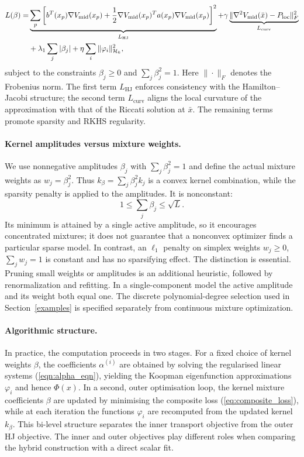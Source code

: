\documentclass[11pt]{article}
\theoremstyle{plain}      %
\theoremstyle{definition} %
\begin{document}
\begin{align}\label{eq:composite_loss}
L(\beta) = & \underbrace{\sum_p \left[ b^{T}(x_p)\nabla V_{\text{mid}}(x_p) + \frac{1}{2} \nabla V_{\text{mid}}(x_p)^{T}a(x_p)\nabla V_{\text{mid}}(x_p)\right]^2}_{L_{\text{HJ}}}
+ \gamma \underbrace{\|\nabla^2 V_{\text{mid}}(\bar{x}) - P_{\text{loc}}\|_F^2}_{L_{\text{curv}}} \notag \\
& + \lambda_1 \sum_j |\beta_j| + \eta \sum_i \|\varphi_i\|_{\mathcal{H}_k}^2,
\end{align}
subject to the constraints \( \beta_j \ge 0 \) and \( \sum_j \beta_j^2 = 1 \). Here $\| \cdot \|_F$ denotes the Frobenius norm. The first term $L_{\text{HJ}}$ enforces consistency with the Hamilton--Jacobi structure; the second term $L_{\text{curv}}$ aligns the local curvature of the approximation with that of the Riccati solution at $\bar{x}$. The remaining terms promote sparsity and RKHS regularity.

\paragraph{Kernel amplitudes versus mixture weights.}\label{sec:amplitudes}
We use nonnegative amplitudes $\beta_j$ with $\sum_j\beta_j^2=1$ and define the actual mixture weights as $w_j=\beta_j^2$. Thus $k_\beta=\sum_j\beta_j^2k_j$ is a convex kernel combination, while the sparsity penalty is applied to the amplitudes. It is nonconstant:
\[
 1\leq\sum_j\beta_j\leq\sqrt L.
\]
Its minimum is attained by a single active amplitude, so it encourages concentrated mixtures; it does not guarantee that a nonconvex optimizer finds a particular sparse model. In contrast, an $\ell_1$ penalty on simplex weights $w_j\geq0$, $\sum_jw_j=1$ is constant and has no sparsifying effect. The distinction is essential. Pruning small weights or amplitudes is an additional heuristic, followed by renormalization and refitting. In a single-component model the active amplitude and its weight both equal one. The discrete polynomial-degree selection used in Section~\ref{examples} is specified separately from continuous mixture optimization.

\paragraph{Algorithmic structure.}
In practice, the computation proceeds in two stages. For a fixed choice of kernel weights $\beta$, the coefficients $\alpha^{(i)}$ are obtained by solving the regularised linear systems (\ref{eqn:alpha_eqn}), yielding the Koopman eigenfunction approximations $\varphi_i$ and hence $\Phi(x)$.  In a second, outer optimisation loop, the kernel mixture coefficients $\beta$ are updated by minimising the composite loss (\ref{eq:composite_loss}), while at each iteration the functions $\varphi_i$ are recomputed from the updated kernel $k_\beta$.  This bi-level structure separates the inner transport objective from the outer HJ objective. The inner and outer objectives play different roles when comparing the hybrid construction with a direct scalar fit.
\end{document}
